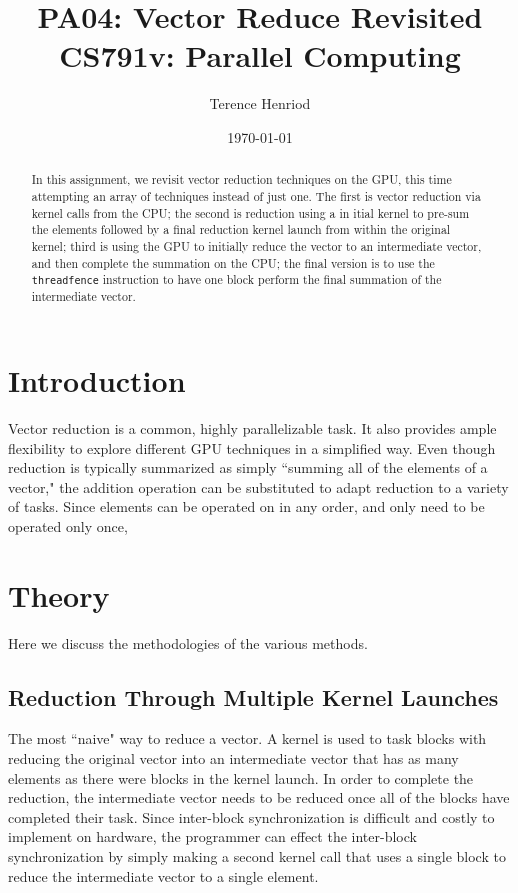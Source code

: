 \documentclass{article}
\title{PA04: Vector Reduce Revisited\\CS791v: Parallel Computing}
\author{Terence Henriod}
\date{\today}
\begin{document}
\clearpage
\maketitle
\thispagestyle{empty} %

\begin{abstract}
In this assignment, we revisit vector reduction techniques on the GPU, this time attempting an array of techniques instead of just one. The first is vector reduction via kernel calls from the CPU; the second is reduction using a in itial kernel to pre-sum the elements followed by a final reduction kernel launch from within the original kernel; third is using the GPU to initially reduce the vector to an intermediate vector, and then complete the summation on the CPU; the final version is to use the \texttt{threadfence} instruction to have one block perform the final summation of the intermediate vector.
\end{abstract}

\newpage
\section{Introduction}
Vector reduction is a common, highly parallelizable task. It also provides ample flexibility to explore different GPU techniques in a simplified way. Even though reduction is typically summarized as simply ``summing all of the elements of a vector," the addition operation can be substituted to adapt reduction to a variety of tasks. Since elements can be operated on in any order, and only need to be operated only once, 

\section{Theory}
Here we discuss the methodologies of the various methods.

\subsection{Reduction Through Multiple Kernel Launches}
The most ``naive" way to reduce a vector. A kernel is used to task blocks with reducing the original vector into an intermediate vector that has as many elements as there were blocks in the kernel launch. In order to complete the reduction, the intermediate vector needs to be reduced once all of the blocks have completed their task. Since inter-block synchronization is difficult and costly to implement on hardware, the programmer can effect the inter-block synchronization by simply making a second kernel call that uses a single block to reduce the intermediate vector to a single element.
\end{document}
